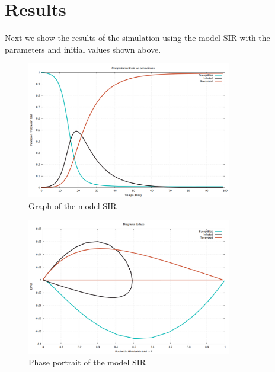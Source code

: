 \documentclass{article}
\begin{document}
\section*{Results}
Next we show the results of the simulation using the model SIR with the parameters and initial values shown above.
\begin{figure}[H]
\centering
\includegraphics[width=0.8\textwidth]{./data/project2/graph-SIR.png}
\caption{Graph of the model SIR}
\end{figure}
\begin{figure}[H]
\centering
\includegraphics[width=0.8\textwidth]{./data/project2/phase-SIR.png}
\caption{Phase portrait of the model SIR}
\end{figure}
\end{document}
